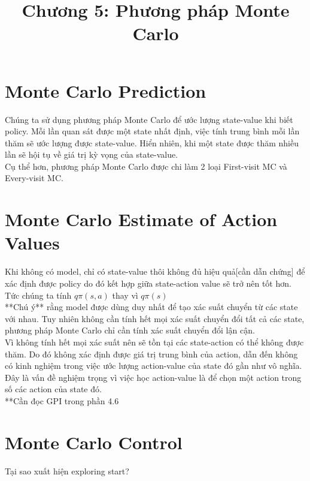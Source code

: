 \documentclass[12pt,a4paper]{article}
\title{Chương 5: Phương pháp Monte Carlo}
\begin{document}
\maketitle
\section{Monte Carlo Prediction}
Chúng ta sử dụng phương pháp Monte Carlo để ước lượng state-value khi biết policy. Mỗi lần quan sát được một state nhất định, việc tính trung bình mỗi lần thăm sẽ ước lượng được state-value. Hiển nhiên, khi một state được thăm nhiều lần sẽ hội tụ về giá trị kỳ vọng của state-value.\\
Cụ thể hơn, phương pháp Monte Carlo được chi làm 2 loại First-visit MC và Every-visit MC.
\section{Monte Carlo Estimate of Action Values}
Khi không có model, chỉ có state-value thôi không đủ hiệu quả[cần dẫn chứng] để xác định được policy do đó kết hợp giữa state-action value sẽ trở nên tốt hơn. Tức chúng ta tính $q{\pi}(s,a)$ thay vì $q{\pi}(s)$\\
**Chú ý** rằng model được dùng duy nhất để tạo xác suất chuyển từ các state với nhau. Tuy nhiên không cần tính hết mọi xác suất chuyển đổi tất cả các state, phương pháp Monte Carlo chỉ cần tính xác suất chuyển đổi lận cận.\\
Vì không tính hết mọi xác suất nên sẽ tồn tại các state-action có thể không được thăm. Do đó không xác định được giá trị trung bình của action, dẫn đến không có kinh nghiệm trong việc ước lượng action-value của state đó gần như vô nghĩa. Đây là vấn đề nghiệm trọng vì việc học action-value là để chọn một action trong số các action của state đó.\\
**Cần đọc GPI trong phần 4.6\\
\section{Monte Carlo Control}
 Tại sao xuất hiện exploring start?
\end{document}
